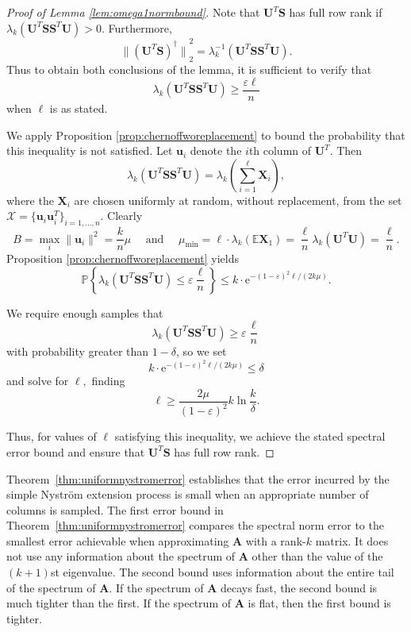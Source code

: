 \documentclass[11pt,letterpaper,twoside,reqno,nosumlimits]{amsart}
\def\pinv{\dagger}
\def\transp{T}
\newcommand{\mat}[1]{\ensuremath{\mathbf{#1}}}
\renewcommand{\vec}[1]{\ensuremath{\mathbf{#1}}}
\newcommand{\e}{\ensuremath{\mathrm{e}}}
\newcommand{\E}{\ensuremath{\mathbb{E}}}
\newcommand{\Prob}[1]{\ensuremath{\mathbb{P}\left\{#1\right\}}}
\newcommand{\norm}[1]{\ensuremath{\big\|#1\big\|}}
\theoremstyle{remark}
\begin{document}
\begin{proof}[Proof of Lemma \ref{lem:omega1normbound}]
 Note that $\mat{U}^\transp \mat{S}$ has full row rank if $\lambda_k(\mat{U}^\transp \mat{S}\mat{S}^\transp \mat{U}) > 0.$ Furthermore,
\[
 \norm{(\mat{U}^\transp \mat{S})^\pinv}_2^2 = \lambda_k^{-1}(\mat{U}^\transp \mat{S} \mat{S}^\transp \mat{U}).
\]
Thus to obtain both conclusions of the lemma, it is sufficient to verify that 
\[
\lambda_k(\mat{U}^\transp \mat{S}\mat{S}^\transp \mat{U}) \geq \frac{\varepsilon \ell}{n}
\]
when $\ell$ is as stated.

We apply Proposition \ref{prop:chernoffworeplacement} to bound the probability that this inequality is not satisfied. Let $\vec{u}_i$ denote the $i$th column of $\mat{U}^\transp.$ Then \[
 \lambda_k(\mat{U}^\transp \mat{S}\mat{S}^\transp \mat{U}) = \lambda_k\left( \sum_{i=1}^\ell \mat{X}_i \right),
\]
where the $\mat{X}_i$ are chosen uniformly at random, without replacement, from the set $\mathcal{X} = \{ \vec{u}_i \vec{u}_i^\transp \}_{i=1,\ldots,n}.$ Clearly
\[
 B = \max_i \|\vec{u}_i\|^2 = \frac{k}{n}\mu \quad \text{ and } \quad  \mu_{\text{min}} = \ell \cdot\lambda_k(\E \mat{X}_1) = \frac{\ell}{n} \lambda_k(\mat{U}^\transp\mat{U}) = \frac{\ell}{n}.
\]
Proposition \ref{prop:chernoffworeplacement} yields
\[
 \Prob{\lambda_k\left(\mat{U}^\transp \mat{S}\mat{S}^\transp \mat{U} \right) \leq \varepsilon \frac{\ell}{n}} \leq k \cdot \e^{-(1-\varepsilon)^2 \ell/(2 k \mu)}.
\]

We require enough samples that 
\[
\lambda_k(\mat{U}^\transp \mat{S}\mat{S}^\transp \mat{U}) \geq \varepsilon \frac{\ell}{n}
\]
with probability greater than $1 - \delta$, so we set 
\[
 k \cdot \e^{-(1-\varepsilon)^2 \ell/(2 k \mu)} \leq \delta 
\]
and solve for $\ell,$ finding
\[
 \ell \geq \frac{2\mu}{(1-\varepsilon)^2} k\ln \frac{k}{\delta}.
\]

Thus, for values of $\ell$ satisfying this inequality, we achieve the stated spectral error bound and ensure that $\mat{U}^\transp \mat{S}$ has full row rank.
\end{proof}

Theorem~\ref{thm:uniformnystromerror} establishes that the error incurred by the simple Nystr\"om extension process is small when an appropriate number of columns is sampled. The first error bound in Theorem~\ref{thm:uniformnystromerror} compares the spectral norm error to the smallest error achievable when approximating $\mat{A}$ with a rank-$k$ matrix. It does not use any information about the spectrum of $\mat{A}$ other than the value of the $(k+1)$st eigenvalue. The second bound uses information about the entire tail of the spectrum of $\mat{A}.$ If the spectrum of $\mat{A}$ decays fast, the second bound is much tighter than the first. If the spectrum of $\mat{A}$ is flat, then the first bound is tighter.
\end{document}
